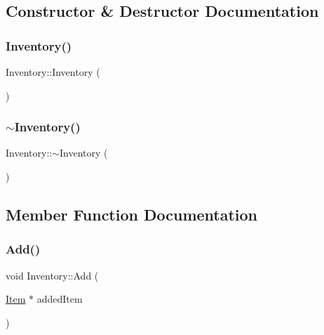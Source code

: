 \subsection{Constructor \& Destructor Documentation}
\mbox{\label{class_inventory_a10485613fc8bfb32ee564d9b5110f8fb}} 
\subsubsection{\texorpdfstring{Inventory()}{Inventory()}}
{\footnotesize\ttfamily Inventory\+::\+Inventory (\begin{DoxyParamCaption}{ }\end{DoxyParamCaption})}

\mbox{\label{class_inventory_a6c6dfcb6d977c74a7abf46809e892e3d}} 
\subsubsection{\texorpdfstring{$\sim$\+Inventory()}{~Inventory()}}
{\footnotesize\ttfamily Inventory\+::$\sim$\+Inventory (\begin{DoxyParamCaption}{ }\end{DoxyParamCaption})\hspace{0.3cm}{\ttfamily [virtual]}}



\subsection{Member Function Documentation}
\mbox{\label{class_inventory_a095bdcb71efeae197032fc6aacd37ed9}} 
\subsubsection{\texorpdfstring{Add()}{Add()}}
{\footnotesize\ttfamily void Inventory\+::\+Add (\begin{DoxyParamCaption}\item[{\mbox{\hyperlink{class_item}{Item}} $\ast$}]{added\+Item }\end{DoxyParamCaption})}



